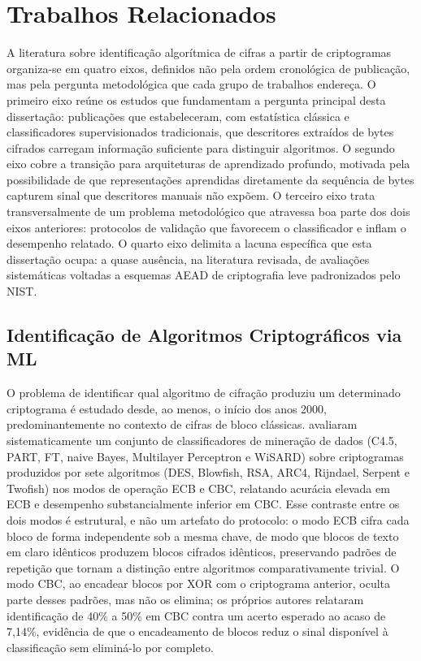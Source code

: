 \chapter{Trabalhos Relacionados}
\label{cap:trabalhos-relacionados}

A literatura sobre identificação algorítmica de cifras a partir de criptogramas organiza-se em quatro eixos, definidos não pela ordem cronológica de publicação, mas pela pergunta metodológica que cada grupo de trabalhos endereça. O primeiro eixo reúne os estudos que fundamentam a pergunta principal desta dissertação: publicações que estabeleceram, com estatística clássica e classificadores supervisionados tradicionais, que descritores extraídos de bytes cifrados carregam informação suficiente para distinguir algoritmos. O segundo eixo cobre a transição para arquiteturas de aprendizado profundo, motivada pela possibilidade de que representações aprendidas diretamente da sequência de bytes capturem sinal que descritores manuais não expõem. O terceiro eixo trata transversalmente de um problema metodológico que atravessa boa parte dos dois eixos anteriores: protocolos de validação que favorecem o classificador e inflam o desempenho relatado. O quarto eixo delimita a lacuna específica que esta dissertação ocupa: a quase ausência, na literatura revisada, de avaliações sistemáticas voltadas a esquemas AEAD de criptografia leve padronizados pelo NIST.

\section{Identificação de Algoritmos Criptográficos via ML}

O problema de identificar qual algoritmo de cifração produziu um determinado criptograma é estudado desde, ao menos, o início dos anos 2000, predominantemente no contexto de cifras de bloco clássicas.  avaliaram sistematicamente um conjunto de classificadores de mineração de dados (C4.5, PART, FT, naive Bayes, Multilayer Perceptron e WiSARD) sobre criptogramas produzidos por sete algoritmos (DES, Blowfish, RSA, ARC4, Rijndael, Serpent e Twofish) nos modos de operação ECB e CBC, relatando acurácia elevada em ECB e desempenho substancialmente inferior em CBC. Esse contraste entre os dois modos é estrutural, e não um artefato do protocolo: o modo ECB cifra cada bloco de forma independente sob a mesma chave, de modo que blocos de texto em claro idênticos produzem blocos cifrados idênticos, preservando padrões de repetição que tornam a distinção entre algoritmos comparativamente trivial. O modo CBC, ao encadear blocos por XOR com o criptograma anterior, oculta parte desses padrões, mas não os elimina; os próprios autores relataram identificação de 40\% a 50\% em CBC contra um acerto esperado ao acaso de 7,14\%, evidência de que o encadeamento de blocos reduz o sinal disponível à classificação sem eliminá-lo por completo.

